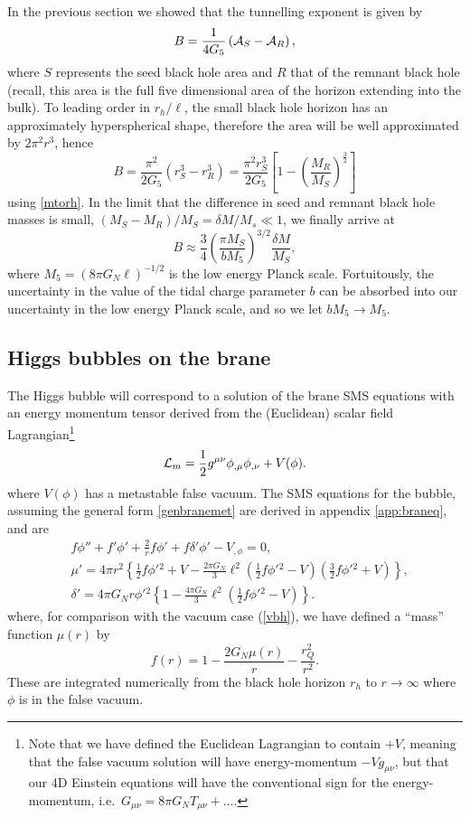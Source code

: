 \documentclass[aps,12pt,prd,superscriptaddress,preprintnumbers, 
	amssymb,
	amsmath,
	notitlepage,
	longbibliography,
	nofootinbib]{revtex4-1}
\newcommand{\be}{\begin{equation}}
\newcommand{\ee}{\end{equation}}
\begin{document}
In the previous section we showed that the tunnelling exponent is given by
\begin{equation}
B=\frac{1}{4G_5}\left({\cal A}_S-{\cal A}_R\right),
\end{equation}
where $S$ represents the seed black hole area
and $R$ that of the remnant black hole (recall, this
area is the full five dimensional area of the horizon
extending into the bulk).
To leading order in $r_h/\ell$, the small black hole horizon has 
an approximately hyperspherical shape, therefore the area will
be well approximated by $2\pi^2 r^3$, hence
\begin{equation}
B= \frac{\pi^2}{2G_5}\left(r_S^3-r_R^3\right)
=  \frac{\pi^2 r_S^3}{2G_5}
\left[1- \left (\frac{M_R}{M_S} \right)^{\frac32}\right]
\end{equation}
using \eqref{mtorh}. In the limit that the difference in seed and
remnant black hole masses is small, $(M_S-M_R)/M_S = 
\delta M/M_s \ll 1$, we finally arrive at
\be
B\approx \frac34 \left(\frac{\pi M_S}{ b M_5}\right)^{3/2}
\frac{\delta M}{M_S},
\label{Bapprox}
\end{equation}
where  $M_5=(8\pi G_N\ell)^{-1/2}$ is the low energy Planck scale. Fortuitously,
the uncertainty in the value of the tidal charge parameter 
$b$ can be absorbed into our uncertainty in the low energy Planck scale, and 
so we let $bM_5\to M_5$.



\subsection{Higgs bubbles on the brane}

The Higgs bubble will correspond to a solution of the brane SMS
equations with an energy momentum tensor derived from the 
(Euclidean) scalar field Lagrangian\footnote{Note that we have
defined the Euclidean Lagrangian to contain $+V$, meaning that
the false vacuum solution will have energy-momentum $-V g_{\mu\nu}$,
but that our 4D Einstein equations will have the conventional sign
for the energy-momentum, i.e.\ $G_{\mu\nu} = 
8\pi G_N T_{\mu\nu}+ \dots$.}
\be
{\cal L}_m=\frac12g^{\mu\nu}\phi_{,\mu}\phi_{,\nu}+V(\phi).
\ee
where $V(\phi)$ has a metastable false vacuum. The SMS equations 
for the bubble, assuming the general form \eqref{genbranemet}
are derived in appendix \ref{app:braneq}, and are
\begin{align}
&f\phi''+f'\phi'+\frac2r f\phi'+f\delta'\phi'-V_{,\phi}=0,\label{eq1}\\
&\mu'=4\pi r^2\left\{ \frac12 f\phi'{}^2+V-
\frac{2\pi G_N}{3}\ell^2(\frac12 f\phi'{}^2-V)
(\frac32 f\phi'{}^2+V)\right\},\label{eq2}\\
&\delta'=4\pi G_N r\phi'{}^2\left\{1-\frac{4\pi G_N}{3}\ell^2
(\frac12 f\phi'{}^2-V)\right\}\label{eq3}.
\end{align}
where, for comparison with the vacuum case (\ref{vbh}), we 
have defined a ``mass'' function $\mu(r)$ by
\be
f(r)=1-\frac{2G_N\mu(r)}{r} - \frac{r_Q^2}{r^2}.
\label{vbub}
\ee
These are integrated numerically from the black hole horizon $r_h$ 
to $r\to\infty$ where $\phi$ is in the false vacuum.
\end{document}
